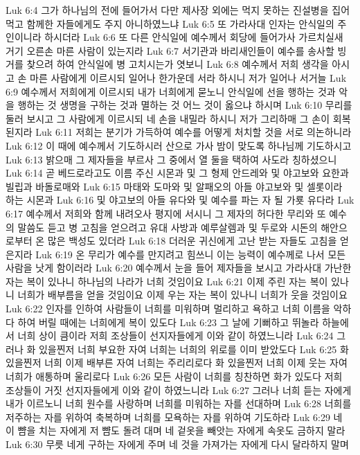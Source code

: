 Luk 6:4  그가 하나님의 전에 들어가서 다만 제사장 외에는 먹지 못하는 진설병을 집어 먹고 함께한 자들에게도 주지 아니하였느냐
Luk 6:5  또 가라사대 인자는 안식일의 주인이니라 하시더라
Luk 6:6  또 다른 안식일에 예수께서 회당에 들어가사 가르치실새 거기 오른손 마른 사람이 있는지라
Luk 6:7  서기관과 바리새인들이 예수를 송사할 빙거를 찾으려 하여 안식일에 병 고치시는가 엿보니
Luk 6:8  예수께서 저희 생각을 아시고 손 마른 사람에게 이르시되 일어나 한가운데 서라 하시니 저가 일어나 서거늘
Luk 6:9  예수께서 저희에게 이르시되 내가 너희에게 묻노니 안식일에 선을 행하는 것과 악을 행하는 것 생명을 구하는 것과 멸하는 것 어느 것이 옳으냐 하시며
Luk 6:10  무리를 둘러 보시고 그 사람에게 이르시되 네 손을 내밀라 하시니 저가 그리하매 그 손이 회복된지라
Luk 6:11  저희는 분기가 가득하여 예수를 어떻게 처치할 것을 서로 의논하니라
Luk 6:12  이 때에 예수께서 기도하시러 산으로 가사 밤이 맞도록 하나님께 기도하시고
Luk 6:13  밝으매 그 제자들을 부르사 그 중에서 열 둘을 택하여 사도라 칭하셨으니
Luk 6:14  곧 베드로라고도 이름 주신 시몬과 및 그 형제 안드레와 및 야고보와 요한과 빌립과 바돌로매와
Luk 6:15  마태와 도마와 및 알패오의 아들 야고보와 및 셀롯이라 하는 시몬과
Luk 6:16  및 야고보의 아들 유다와 및 예수를 파는 자 될 가룟 유다라
Luk 6:17  예수께서 저희와 함께 내려오사 평지에 서시니 그 제자의 허다한 무리와 또 예수의 말씀도 듣고 병 고침을 얻으려고 유대 사방과 예루살렘과 및 두로와 시돈의 해안으로부터 온 많은 백성도 있더라
Luk 6:18  더러운 귀신에게 고난 받는 자들도 고침을 얻은지라
Luk 6:19  온 무리가 예수를 만지려고 힘쓰니 이는 능력이 예수께로 나서 모든 사람을 낫게 함이러라
Luk 6:20  예수께서 눈을 들어 제자들을 보시고 가라사대 가난한 자는 복이 있나니 하나님의 나라가 너희 것임이요
Luk 6:21  이제 주린 자는 복이 있나니 너희가 배부름을 얻을 것임이요 이제 우는 자는 복이 있나니 너희가 웃을 것임이요
Luk 6:22  인자를 인하여 사람들이 너희를 미워하며 멀리하고 욕하고 너희 이름을 악하다 하여 버릴 때에는 너희에게 복이 있도다
Luk 6:23  그 날에 기뻐하고 뛰놀라 하늘에서 너희 상이 큼이라 저희 조상들이 선지자들에게 이와 같이 하였느니라
Luk 6:24  그러나 화 있을찐저 너희 부요한 자여 너희는 너희의 위로를 이미 받았도다
Luk 6:25  화 있을찐저 너희 이제 배부른 자여 너희는 주리리로다 화 있을찐저 너희 이제 웃는 자여 너희가 애통하며 울리로다
Luk 6:26  모든 사람이 너희를 칭찬하면 화가 있도다 저희 조상들이 거짓 선지자들에게 이와 같이 하였느니라
Luk 6:27  그러나 너희 듣는 자에게 내가 이르노니 너희 원수를 사랑하며 너희를 미워하는 자를 선대하며
Luk 6:28  너희를 저주하는 자를 위하여 축복하며 너희를 모욕하는 자를 위하여 기도하라
Luk 6:29  네 이 뺨을 치는 자에게 저 뺨도 돌려 대며 네 겉옷을 빼앗는 자에게 속옷도 금하지 말라
Luk 6:30  무릇 네게 구하는 자에게 주며 네 것을 가져가는 자에게 다시 달라하지 말며
